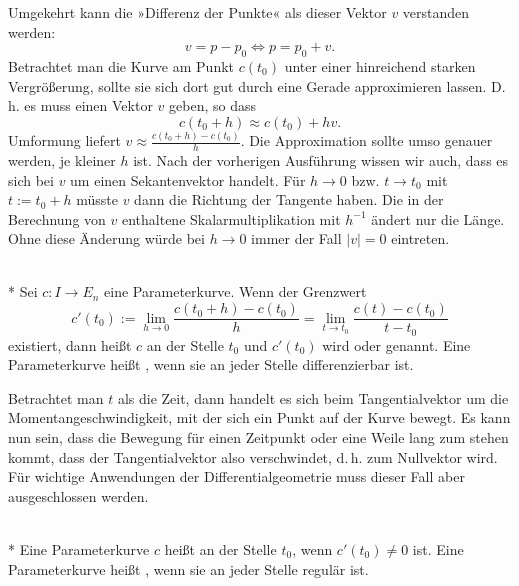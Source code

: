 Umgekehrt kann die »Differenz der Punkte« als dieser Vektor $v$
verstanden werden:%
\begin{equation}
v = p-p_0 \iff p = p_0+v.
\end{equation}
Betrachtet man die Kurve am Punkt $c(t_0)$ unter einer hinreichend
starken Vergrößerung, sollte sie sich dort gut durch
eine Gerade approximieren lassen. D.\,h. es muss einen Vektor $v$
geben, so dass
\begin{equation}
c(t_0+h) \approx c(t_0)+hv.
\end{equation}
Umformung liefert $v \approx \tfrac{c(t_0+h)-c(t_0)}{h}$.
Die Approximation sollte umso genauer werden, je kleiner $h$ ist.
Nach der vorherigen Ausführung wissen wir auch, dass es sich bei
$v$ um einen Sekantenvektor handelt. Für $h\to 0$ bzw.
$t\to t_0$ mit $t:=t_0+h$ müsste $v$ dann die Richtung der Tangente
haben. Die in der Berechnung von $v$ enthaltene Skalarmultiplikation
mit $h^{-1}$ ändert nur die Länge. Ohne diese Änderung würde bei $h\to 0$
immer der Fall $|v|=0$ eintreten.
\begin{definition}%
\label{diff-Parameterkurve}\mbox{}\\*
Sei $c\colon I\to E_n$ eine Parameterkurve. Wenn der Grenzwert
\begin{equation}
c'(t_0) := \lim_{h\to 0} \frac{c(t_0+h)-c(t_0)}{h}
= \lim_{t\to t_0} \frac{c(t)-c(t_0)}{t-t_0}
\end{equation}
existiert, dann heißt $c$ an der Stelle $t_0$
 und $c'(t_0)$ wird 
oder  genannt. Eine Parameterkurve heißt
, wenn sie an jeder Stelle differenzierbar ist.
\end{definition}
Betrachtet man $t$ als die Zeit, dann handelt es sich beim
Tangentialvektor um die Momentangeschwindigkeit, mit der sich ein
Punkt auf der Kurve bewegt. Es kann nun sein, dass die Bewegung für
einen Zeitpunkt oder eine Weile lang zum stehen kommt, dass der
Tangentialvektor also verschwindet, d.\,h. zum Nullvektor wird.
Für wichtige Anwendungen der Differentialgeometrie muss dieser
Fall aber ausgeschlossen werden.
\begin{definition}\mbox{}\\*
Eine Parameterkurve $c$ heißt  an der Stelle $t_0$,
wenn $c'(t_0)\ne 0$ ist. Eine Parameterkurve heißt ,
wenn sie an jeder Stelle regulär ist.
\end{definition}

